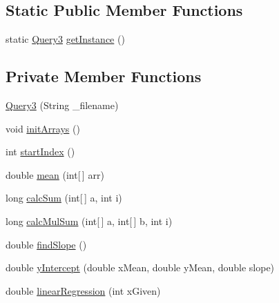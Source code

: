 \subsection*{Static Public Member Functions}
\begin{DoxyCompactItemize}
\item 
static \hyperlink{classQuery3}{Query3} \hyperlink{classQuery3_a4be96065aec730ecae94b6cd4f086bd1}{get\+Instance} ()
\end{DoxyCompactItemize}
\subsection*{Private Member Functions}
\begin{DoxyCompactItemize}
\item 
\hyperlink{classQuery3_a4fbeb44bc0d6cf64b69c3786079ff607}{Query3} (String \+\_\+filename)
\item 
void \hyperlink{classQuery3_af36aaf92bc68455320f314f748107ba5}{init\+Arrays} ()
\item 
int \hyperlink{classQuery3_a3e717858e45a5e523e6f6822b8ee9c55}{start\+Index} ()
\item 
double \hyperlink{classQuery3_a7cd505a50c7acdad72f8d84e0783d40f}{mean} (int\mbox{[}$\,$\mbox{]} arr)
\item 
long \hyperlink{classQuery3_aed079f7c366024a82d93de739bf748a8}{calc\+Sum} (int\mbox{[}$\,$\mbox{]} a, int i)
\item 
long \hyperlink{classQuery3_a400754740a1332b01276e1219fb23558}{calc\+Mul\+Sum} (int\mbox{[}$\,$\mbox{]} a, int\mbox{[}$\,$\mbox{]} b, int i)
\item 
double \hyperlink{classQuery3_ab20e5f00158bfc416143b645d4ea5f0f}{find\+Slope} ()
\item 
double \hyperlink{classQuery3_ae0e1667d9216468b12b863d0e6b89462}{y\+Intercept} (double x\+Mean, double y\+Mean, double slope)
\item 
double \hyperlink{classQuery3_a9f213eab98fc93aa00e6432d62680982}{linear\+Regression} (int x\+Given)
\end{DoxyCompactItemize}
